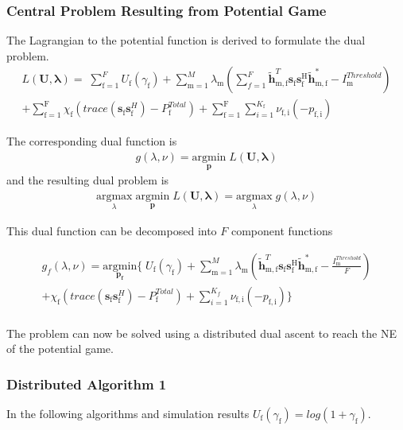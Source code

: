 \documentclass[12pt,a4paper]{report}
\begin{document}
\subsubsection{Central Problem Resulting from Potential Game}
The Lagrangian to the potential function is derived to formulate the dual problem. 
\begin{multline}
L(\mathbf{U,\lambda}) = 
\;
\sum_{\text{f}=1}^F U_{\text{f}}(\gamma_{\text{f}}) 
+
\sum_{\mathrm{m=1}}^M \lambda_{\mathrm{m}}
(	  \sum^F_{f=1} \mathbf{\tilde{h}}_{\mathrm{m,f}}^T  \mathbf{s}_{\mathrm{f}} 						
	\mathbf{s_{\mathrm{f}}^{\mathrm{H}}} \mathbf{\tilde{h}_{\mathrm{m,f}}^*} - I^{Threshold}		
	_{\mathrm{m}} )
\\
+ 
\sum_{\text{f}=1}^\text{F}
\chi_{\mathrm{f}}(trace(\mathbf{s}_\mathrm{f}\mathbf{s}_\mathrm{f}^H)-P^{Total}_{\text{f}} )
+
\sum_{\text{f}=1}^\text{F}
\sum_{i=1}^{K_{\text{f}}}
\nu_{\mathrm{f,i}}(-p_{\mathrm{f,i}})
\end{multline}

The corresponding dual function is
\begin{gather*}
g(\lambda,\nu) = \underset{\mathbf{p}}{\mathrm{argmin}}\;L(\mathbf{U,\lambda})
\end{gather*}
and the resulting dual problem is
\begin{gather*}
\underset{\lambda}{\mathrm{argmax}}\;\underset{\mathbf{p}}{\mathrm{argmin}}\;L(\mathbf{U,\lambda}) = \underset{\lambda}{\mathrm{argmax}}\;g(\lambda,\nu)
\end{gather*}

This dual function can be decomposed into $F$ component functions


\begin{multline}
g_f(\lambda,\nu) = \underset{\mathbf{p_f}}{\mathrm{argmin}}
\{
\;
U_{\text{f}}(\gamma_{\text{f}}) 
+
\sum_{\mathrm{m=1}}^M \lambda_{\mathrm{m}}
(\mathbf{\tilde{h}}_{\mathrm{m,f}}^T  \mathbf{s}_{\mathrm{f}} 						
	\mathbf{s_{\mathrm{f}}^{\mathrm{H}}} \mathbf{\tilde{h}_{\mathrm{m,f}}^*} - \frac{I^{Threshold}_{\mathrm{m}}}{F})
\\
+ 
\chi_{\mathrm{f}}(trace(\mathbf{s}_\mathrm{f}\mathbf{s}_\mathrm{f}^H)-P^{Total}_{\text{f}} )
+
\sum_{i=1}^{K_f}
\nu_{\mathrm{f,i}}(-p_{\mathrm{f,i}})\}
\end{multline}
\\

The problem can now be solved using a distributed dual ascent to reach the NE of the potential game. 
\subsubsection{Distributed Algorithm 1}\label{algo1}
In the following algorithms and simulation results $U_{\text{f}}(\gamma_{\text{f}}) = log(1+\gamma_{\text{f}})$.
\end{document}
